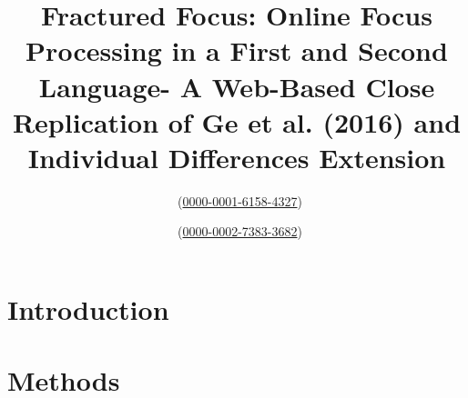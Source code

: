 \documentclass[sn-apa]{sn-jnl}%
\theoremstyle{thmstyleone}%
\theoremstyle{thmstyletwo}%
\theoremstyle{thmstylethree}%
\begin{document}
\title[Article Title]{Fractured Focus: Online Focus Processing in a First and Second Language- A Web-Based Close Replication of Ge et al. (2016) and Individual Differences Extension}


\author[1]{ ~(\href{https://orcid.org/0000-0001-6158-4327}{0000-0001-6158-4327})}
\author*[1]{ ~(\href{https://orcid.org/0000-0002-7383-3682}{0000-0002-7383-3682})}









\abstract{}








\maketitle
\section{Introduction}\label{sec1}


\section{Methods}\label{sec2}

\end{document}
